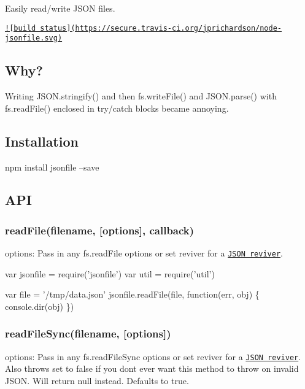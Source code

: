 Easily read/write J\+S\+O\+N files.

\href{http://travis-ci.org/jprichardson/node-jsonfile}{\tt !\mbox{[}build status\mbox{]}(https\+://secure.\+travis-\/ci.\+org/jprichardson/node-\/jsonfile.\+svg)}

\subsection*{Why? }

Writing {\ttfamily J\+S\+O\+N.\+stringify()} and then {\ttfamily fs.\+write\+File()} and {\ttfamily J\+S\+O\+N.\+parse()} with {\ttfamily fs.\+read\+File()} enclosed in {\ttfamily try/catch} blocks became annoying.

\subsection*{Installation }

\begin{DoxyVerb}npm install jsonfile --save
\end{DoxyVerb}


\subsection*{A\+P\+I }

\subsubsection*{read\+File(filename, \mbox{[}options\mbox{]}, callback)}

{\ttfamily options}\+: Pass in any {\ttfamily fs.\+read\+File} options or set {\ttfamily reviver} for a \href{https://developer.mozilla.org/en-US/docs/Web/JavaScript/Reference/Global_Objects/JSON/parse}{\tt J\+S\+O\+N reviver}.


\begin{DoxyCode}
var jsonfile = require(\textcolor{stringliteral}{'jsonfile'})
var util = require('util')

var file = '/tmp/data.json'
jsonfile.readFile(file, function(err, obj) \{
  console.dir(obj)
\})
\end{DoxyCode}


\subsubsection*{read\+File\+Sync(filename, \mbox{[}options\mbox{]})}

{\ttfamily options}\+: Pass in any {\ttfamily fs.\+read\+File\+Sync} options or set {\ttfamily reviver} for a \href{https://developer.mozilla.org/en-US/docs/Web/JavaScript/Reference/Global_Objects/JSON/parse}{\tt J\+S\+O\+N reviver}. Also {\ttfamily throws} set to {\ttfamily false} if you don\textquotesingle{}t ever want this method to throw on invalid J\+S\+O\+N. Will return {\ttfamily null} instead. Defaults to {\ttfamily true}.


